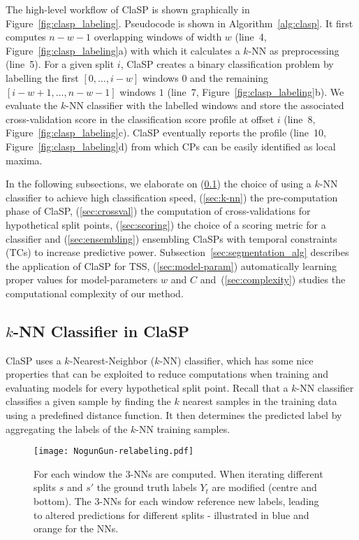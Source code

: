 \documentclass[pdflatex,sn-basic]{sn-jnl}
\begin{document}
The high-level workflow of ClaSP is shown graphically in Figure~\ref{fig:clasp_labeling}. Pseudocode is shown in Algorithm~\ref{alg:clasp}. It first computes $n-w-1$ overlapping windows of width $w$ (line~4, Figure~\ref{fig:clasp_labeling}a) with which it calculates a $k$-NN as preprocessing (line~5). For a given split $i$, ClaSP creates a binary classification problem by labelling the first $[0,\dots,i-w]$ windows $0$ and the remaining $[i-w+1,\dots,n-w-1]$ windows $1$ (line~7, Figure~\ref{fig:clasp_labeling}b). We evaluate the $k$-NN classifier with the labelled windows and store the associated cross-validation score in the classification score profile at offset $i$ (line~8, Figure~\ref{fig:clasp_labeling}c). ClaSP eventually reports the profile (line~10, Figure~\ref{fig:clasp_labeling}d) from which CPs can be easily identified as local maxima.

In the following subsections, we elaborate on (\ref{sec:classifier}) the choice of using a $k$-NN classifier to achieve high classification speed, (\ref{sec:k-nn}) the pre-computation phase of ClaSP, (\ref{sec:crossval}) the computation of cross-validations for hypothetical split points, (\ref{sec:scoring}) the choice of a scoring metric for a classifier and (\ref{sec:ensembling}) ensembling ClaSPs with temporal constraints (TCs) to increase predictive power. Subsection~\ref{sec:segmentation_alg} describes the application of ClaSP for TSS, (\ref{sec:model-param}) automatically learning proper values for model-parameters $w$ and $C$ and~(\ref{sec:complexity}) studies the computational complexity of our method.

\subsection{$k$-NN Classifier in ClaSP} \label{sec:classifier}

ClaSP uses a $k$-Nearest-Neighbor ($k$-NN) classifier, which has some nice properties that can be exploited to reduce computations when training and evaluating models for every hypothetical split point. Recall that a $k$-NN classifier classifies a given sample by finding the $k$ nearest samples in the training data using a predefined distance function. It then determines the predicted label by aggregating the labels of the $k$-NN training samples. 

\begin{figure}[t]
	\texttt{[image: NogunGun-relabeling.pdf]}
	\caption{For each window the 3-NNs are computed. When iterating different splits $s$ and $s'$ the ground truth labels $Y_t$ are modified (centre and bottom). The 3-NNs for each window reference new labels, leading to altered predictions for different splits - illustrated in blue and orange for the NNs.
	\label{fig:clasp_relabeling}
	}
\end{figure}
\end{document}
